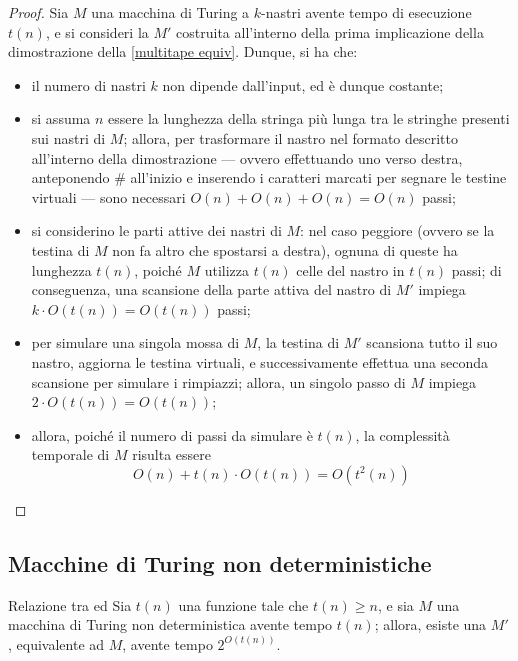 \documentclass[a4paper, 12pt]{report}
\begin{document}
    \begin{proof}
        Sia $M$ una macchina di Turing a $k$-nastri avente tempo di esecuzione $t(n)$, e si consideri la \TM $M'$ costruita all'interno della prima implicazione della dimostrazione della \cref{multitape equiv}. Dunque, si ha che:

        \begin{itemize}
            \item il numero di nastri $k$ non dipende dall'input, ed è dunque costante;
            \item si assuma $n$ essere la lunghezza della stringa più lunga tra le stringhe presenti sui nastri di $M$; allora, per trasformare il nastro nel formato descritto all'interno della dimostrazione --- ovvero effettuando uno  verso destra, anteponendo \ttt \# all'inizio e inserendo i caratteri marcati per segnare le testine virtuali --- sono necessari $O(n) + O(n) + O(n) = O(n)$ passi;
            \item si considerino le parti attive dei nastri di $M$: nel caso peggiore (ovvero se la testina di $M$ non fa altro che spostarsi a destra), ognuna di queste ha lunghezza $t(n)$, poiché $M$ utilizza $t(n)$ celle del nastro in $t(n)$ passi; di conseguenza, una scansione della parte attiva del nastro di $M'$ impiega $k \cdot O(t(n))= O(t(n))$ passi;
            \item per simulare una singola mossa di $M$, la testina di $M'$ scansiona tutto il suo nastro, aggiorna le testina virtuali, e successivamente effettua una seconda scansione per simulare i rimpiazzi; allora, un singolo passo di $M$ impiega $2 \cdot O(t(n)) = O(t(n))$;
            \item allora, poiché il numero di passi da simulare è $t(n)$, la complessità temporale di $M$ risulta essere $$O(n) + t(n) \cdot O(t(n)) = O(t^2(n))$$
        \end{itemize}
    \end{proof}

    \subsection{Macchine di Turing non deterministiche}

    \begin{framedthm}[label={ntm time}]{Relazione tra \TM ed \NTM}
        Sia $t(n)$ una funzione tale che $t(n) \ge n$, e sia $M$ una macchina di Turing non deterministica avente tempo $t(n)$; allora, esiste una \TM $M'$, equivalente ad $M$, avente tempo $2^{O(t(n))}$.
    \end{framedthm}
\end{document}
